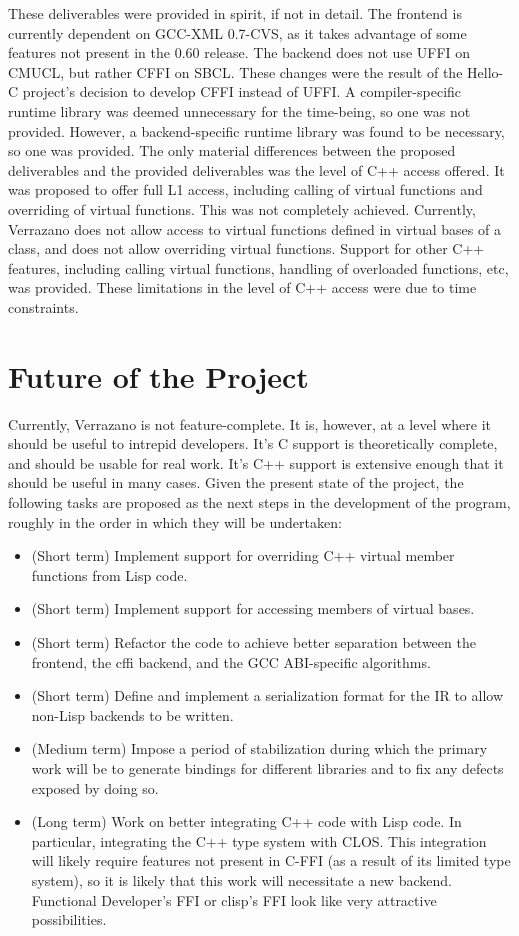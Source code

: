\documentclass[12pt]{article}
\begin{document}
These deliverables were provided in spirit, if not in detail. The frontend is currently dependent on GCC-XML 0.7-CVS, as it takes advantage of some features not present in the 0.60 release. The backend does not use UFFI on CMUCL, but rather CFFI on SBCL. These changes were the result of the Hello-C project's decision to develop CFFI instead of UFFI. A compiler-specific runtime library was deemed unnecessary for the time-being, so one was not provided. However, a backend-specific runtime library was found to be necessary, so one was provided. The only material differences between the proposed deliverables and the provided deliverables was the level of C++ access offered. It was proposed to offer full L1 access, including calling of virtual functions and overriding of virtual functions. This was not completely achieved. Currently, Verrazano does not allow access to virtual functions defined in virtual bases of a class, and does not allow overriding virtual functions. Support for other C++ features, including calling virtual functions, handling of overloaded functions, etc, was provided. These limitations in the level of C++ access were due to time constraints. 

\section{Future of the Project}

Currently, Verrazano is not feature-complete. It is, however, at a level where it should be useful to intrepid developers. It's C support is theoretically complete, and should be usable for real work. It's C++ support is extensive enough that it should be useful in many cases. Given the present state of the project, the following tasks are proposed as the next steps in the development of the program, roughly in the order in which they will be undertaken:

\begin{itemize}
\item (Short term) Implement support for overriding C++ virtual member functions from Lisp code.
\item (Short term) Implement support for accessing members of virtual bases.
\item (Short term) Refactor the code to achieve better separation between the frontend, the cffi backend, and the GCC ABI-specific algorithms. 
\item (Short term) Define and implement a serialization format for the IR to allow non-Lisp backends to be written. 
\item (Medium term) Impose a period of stabilization during which the primary work will be to generate bindings for different libraries and to fix any defects exposed by doing so.
\item (Long term) Work on better integrating C++ code with Lisp code. In particular, integrating the C++ type system with CLOS. This integration will likely require features not present in C-FFI (as a result of its limited type system), so it is likely that this work will necessitate a new backend. Functional Developer's FFI or clisp's FFI look like very attractive possibilities.
\end{itemize}
\end{document}
